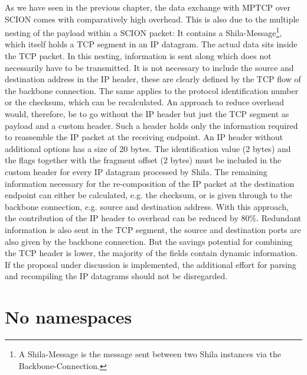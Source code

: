 As we have seen in the previous chapter, the data exchange with MPTCP over SCION comes with comparatively high overhead. This is also due to the multiple nesting of the payload within a SCION packet: It contains a Shila-Message\footnote{A Shila-Message is the message sent between two Shila instances via the Backbone-Connection.}, which itself holds a TCP segment in an IP datagram. The actual data sits inside the TCP packet. In this nesting, information is sent along which does not necessarily have to be transmitted. It is not necessary to include the source and destination address in the IP header, these are clearly defined by the TCP flow of the backbone connection. The same applies to the protocol identification number or the checksum, which can be recalculated. An approach to reduce overhead would, therefore, be to go without the IP header but just the TCP segment as payload and a custom header. Such a header holds only the information required to reassemble the IP packet at the receiving endpoint. An IP header without additional options has a size of 20 bytes. The identification value (2 bytes) and the flags together with the fragment offset (2 bytes) must be included in the custom header for every IP datagram processed by Shila. The remaining information necessary for the re-composition of the IP packet at the destination endpoint can either be calculated, e.g. the checksum, or is given through to the backbone connection, e.g. source and destination address. With this approach, the contribution of the IP header to overhead can be reduced by 80\%. Redundant information is also sent in the TCP segment, the source and destination ports are also given by the backbone connection. But the savings potential for combining the TCP header is lower, the majority of the fields contain dynamic information. If the proposal under discussion is implemented, the additional effort for parsing and recompiling the IP datagrams should not be disregarded.
	
\section*{No namespaces}

